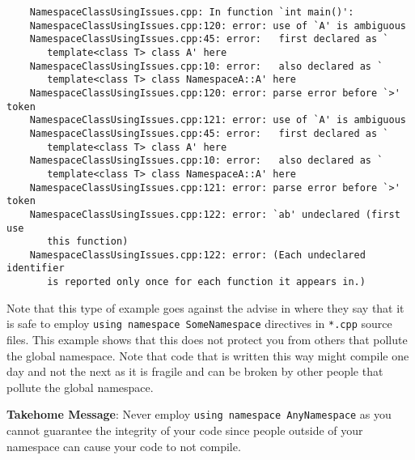 \begin{enumerate}
{\begin{verbatim}
    NamespaceClassUsingIssues.cpp: In function `int main()':
    NamespaceClassUsingIssues.cpp:120: error: use of `A' is ambiguous
    NamespaceClassUsingIssues.cpp:45: error:   first declared as `
       template<class T> class A' here
    NamespaceClassUsingIssues.cpp:10: error:   also declared as `
       template<class T> class NamespaceA::A' here
    NamespaceClassUsingIssues.cpp:120: error: parse error before `>' token
    NamespaceClassUsingIssues.cpp:121: error: use of `A' is ambiguous
    NamespaceClassUsingIssues.cpp:45: error:   first declared as `
       template<class T> class A' here
    NamespaceClassUsingIssues.cpp:10: error:   also declared as `
       template<class T> class NamespaceA::A' here
    NamespaceClassUsingIssues.cpp:121: error: parse error before `>' token
    NamespaceClassUsingIssues.cpp:122: error: `ab' undeclared (first use 
       this function)
    NamespaceClassUsingIssues.cpp:122: error: (Each undeclared identifier 
       is reported only once for each function it appears in.)
\end{verbatim}}

Note that this type of example goes against the advise in {}\cite[Item
59]{C++CodingStandards05} where they say that it is safe to employ
{}\texttt{using namespace SomeNamespace} directives in {}\texttt{*.cpp} source
files.  This example shows that this does not protect you from others that
pollute the global namespace.  Note that code that is written this way might
compile one day and not the next as it is fragile and can be broken by other
people that pollute the global namespace.

{}\textbf{Takehome Message}: Never employ {}\texttt{using namespace
AnyNamespace} as you cannot guarantee the integrity of your code since people
outside of your namespace can cause your code to not compile.

\end{enumerate}
